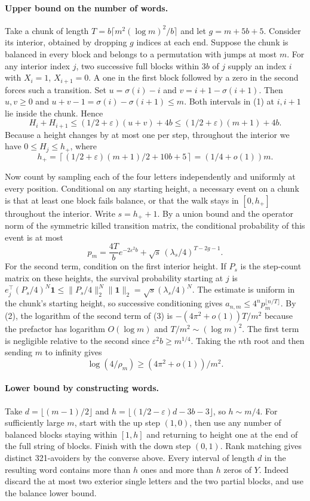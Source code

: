 \documentclass[11pt]{article}
\begin{document}
\paragraph{Upper bound on the number of words.}
Take a chunk of length $T=b\lceil m^2(\log m)^2/b\rceil$ and let $g=m+5b+5$. Consider its interior, obtained by dropping $g$ indices at each end. Suppose the chunk is balanced in every block and belongs to a permutation with jumps at most $m$. For any interior index $j$, two successive full blocks within $3b$ of $j$ supply an index $i$ with $X_i=1$, $X_{i+1}=0$. A one in the first block followed by a zero in the second forces such a transition. Set $u=\sigma(i)-i$ and $v=i+1-\sigma(i+1)$. Then $u,v\ge0$ and $u+v-1=\sigma(i)-\sigma(i+1)\le m$. Both intervals in (1) at $i,i+1$ lie inside the chunk. Hence
\[
 H_i+H_{i+1}\le(1/2+\varepsilon)(u+v)+4b
             \le (1/2+\varepsilon)(m+1)+4b .
\]
Because a height changes by at most one per step, throughout the interior we have $0\le H_j\le h_+$, where
\[
 h_+=\left\lceil(1/2+\varepsilon)(m+1)/2+10b+5\right\rceil
     =(1/4+o(1))m .
\]

Now count by sampling each of the four letters independently and uniformly at every position. Conditional on any starting height, a necessary event on a chunk is that at least one block fails balance, or that the walk stays in $[0,h_+]$ throughout the interior. Write $s=h_++1$. By a union bound and the operator norm of the symmetric killed transition matrix, the conditional probability of this event is at most
\[
 p_m=\frac{4T}{b}e^{-2\varepsilon^2 b}
       +\sqrt{s}\,(\lambda_s/4)^{T-2g-1}.                       \tag{3}
\]
For the second term, condition on the first interior height. If $P_s$ is the step-count matrix on these heights, the survival probability starting at $j$ is $e_j^\top(P_s/4)^N\mathbf1\le\|P_s/4\|_2^N\|\mathbf1\|_2=\sqrt{s}(\lambda_s/4)^N$. The estimate is uniform in the chunk's starting height, so successive conditioning gives $a_{n,m}\le4^n p_m^{\lfloor n/T\rfloor}$. By (2), the logarithm of the second term of (3) is $-(4\pi^2+o(1))T/m^2$ because the prefactor has logarithm $O(\log m)$ and $T/m^2\sim(\log m)^2$. The first term is negligible relative to the second since $\varepsilon^2 b\ge m^{1/4}$. Taking the $n$th root and then sending $m$ to infinity gives
\[
 \log(4/\rho_m)\ge(4\pi^2+o(1))/m^2 .                          \tag{4}
\]

\paragraph{Lower bound by constructing words.}
Take $d=\lfloor(m-1)/2\rfloor$ and $h=\lfloor(1/2-\varepsilon)d-3b-3\rfloor$, so $h\sim m/4$. For sufficiently large $m$, start with the up step $(1,0)$, then use any number of balanced blocks staying within $[1,h]$ and returning to height one at the end of the full string of blocks. Finish with the down step $(0,1)$. Rank matching gives distinct 321-avoiders by the converse above. Every interval of length $d$ in the resulting word contains more than $h$ ones and more than $h$ zeros of $Y$. Indeed discard the at most two exterior single letters and the two partial blocks, and use the balance lower bound.
\end{document}
